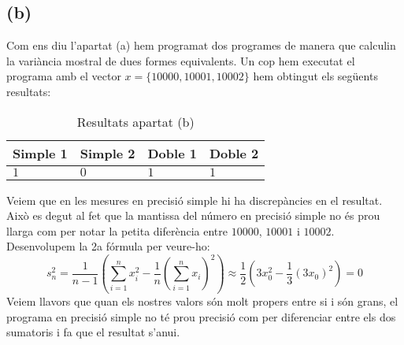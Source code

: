 \documentclass[a4paper,10pt]{article}
\begin{document}
  \subsection*{(b)}
  Com ens diu l'apartat (a) hem programat dos programes de manera que calculin la variància mostral de dues formes equivalents. Un cop hem executat el programa amb el vector $x = \{10000, 10001, 10002\}$ hem obtingut els següents resultats:
	\begin{table}[H]
    \begin{center}
      \begin{tabular}[c]{|p{20mm}|p{20 mm}|p{20 mm}|p{20 mm}|}
			\hline 
			Simple 1 & Simple 2  & Doble 1  & Doble 2  \\ 
			\hline  
			$1$
			&
			$0$
			& 
			$1$
			&
			$1$ \\
			\hline
      \end{tabular}
		\caption{Resultats apartat (b)}
    \end{center}
  \end{table}
  Veiem que en les mesures en precisió simple hi ha discrepàncies en el resultat. Això es degut al fet que la mantissa del número en precisió simple no és prou llarga com per notar la petita diferència entre $10000$, $10001$ i $10002$. Desenvolupem la 2a fórmula per veure-ho:
  \begin{equation} \label{aquasio}
      s^2_n = \frac{1}{n-1} \left( \sum_{i=1}^{n} x_i^2 - \frac{1}{n} \left( \sum_{i=1}^{n} x_i \right) ^2 \right)
      \approx \frac{1}{2} \left( 3x_0^2 - \frac{1}{3} (3x_0)^2 \right) = 0
  \end{equation}
  Veiem llavors que quan els nostres valors són molt propers entre si i són grans, el programa en precisió simple no té prou precisió com per diferenciar entre els dos sumatoris i fa que el resultat s'anu\lgem i.
\end{document}
